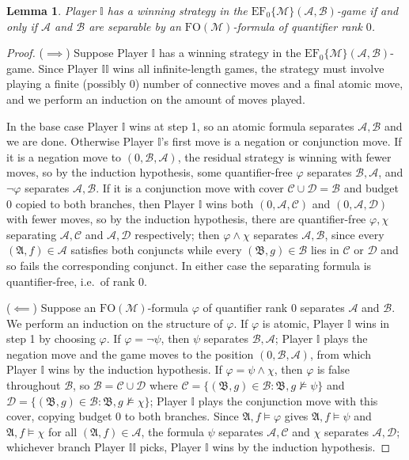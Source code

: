 \documentclass{article}
\newtheorem{lemma}[theorem]{Lemma}
\theoremstyle{definition}
\begin{document}
\begin{lemma}\label{lem:ef-minor-basecase}
    Player $\mathbb{I}$ has a winning strategy in the $\mathrm{EF}_0\{\mathcal{M}\}(\mathcal{A},\mathcal{B})$-game if and only if $\mathcal{A}$ and $\mathcal{B}$ are separable by an $\mathrm{FO}(\mathcal{M})$-formula of quantifier rank $0$.
\end{lemma}
\begin{proof}
    ($\implies$) Suppose Player $\mathbb{I}$ has a winning strategy in the $\mathrm{EF}_0\{\mathcal{M}\}(\mathcal{A},\mathcal{B})$-game. Since Player $\mathbb{II}$ wins all infinite-length games, the strategy must involve playing a finite (possibly $0$) number of connective moves and a final atomic move, and we perform an induction on the amount of moves played.
    
    In the base case Player $\mathbb{I}$ wins at step 1, so an atomic formula separates $\mathcal A,\mathcal B$ and we are done. Otherwise Player $\mathbb{I}$'s first move is a negation or conjunction move. If it is a negation move to $(0,\mathcal B,\mathcal A)$, the residual strategy is winning with fewer moves, so by the induction hypothesis, some quantifier-free $\varphi$ separates $\mathcal B,\mathcal A$, and $\neg\varphi$ separates $\mathcal A,\mathcal B$. If it is a conjunction move with cover $\mathcal C\cup\mathcal D=\mathcal B$ and budget $0$ copied to both branches, then Player $\mathbb{I}$ wins both $(0,\mathcal A,\mathcal C)$ and $(0,\mathcal A,\mathcal D)$ with fewer moves, so by the induction hypothesis, there are quantifier-free $\varphi,\chi$ separating $\mathcal A,\mathcal C$ and $\mathcal A,\mathcal D$ respectively; then $\varphi\land\chi$ separates $\mathcal A,\mathcal B$, since every $(\mathfrak A,f)\in\mathcal A$ satisfies both conjuncts while every $(\mathfrak B,g)\in\mathcal B$ lies in $\mathcal C$ or $\mathcal D$ and so fails the corresponding conjunct. In either case the separating formula is quantifier-free, i.e.\ of rank $0$.

    ($\impliedby$) Suppose an $\mathrm{FO}(\mathcal{M})$-formula $\varphi$ of quantifier rank $0$ separates $\mathcal{A}$ and $\mathcal{B}$. We perform an induction on the structure of $\varphi$. If $\varphi$ is atomic, Player $\mathbb{I}$ wins in step 1 by choosing $\varphi$. If $\varphi=\neg\psi$, then $\psi$ separates $\mathcal B,\mathcal A$; Player $\mathbb{I}$ plays the negation move and the game moves to the position $(0,\mathcal B,\mathcal A)$, from which Player $\mathbb{I}$ wins by the induction hypothesis. If $\varphi=\psi\land\chi$, then $\varphi$ is false throughout $\mathcal B$, so $\mathcal B=\mathcal C\cup\mathcal D$ where $\mathcal C=\{(\mathfrak B,g)\in\mathcal B:\mathfrak B,g\not\models\psi\}$ and $\mathcal D=\{(\mathfrak B,g)\in\mathcal B:\mathfrak B,g\not\models\chi\}$; Player $\mathbb{I}$ plays the conjunction move with this cover, copying budget $0$ to both branches. Since $\mathfrak A,f\models\varphi$ gives $\mathfrak A,f\models\psi$ and $\mathfrak A,f\models\chi$ for all $(\mathfrak A,f)\in\mathcal A$, the formula $\psi$ separates $\mathcal A,\mathcal C$ and $\chi$ separates $\mathcal A,\mathcal D$; whichever branch Player $\mathbb{II}$ picks, Player $\mathbb{I}$ wins by the induction hypothesis.
\end{proof}
\end{document}
